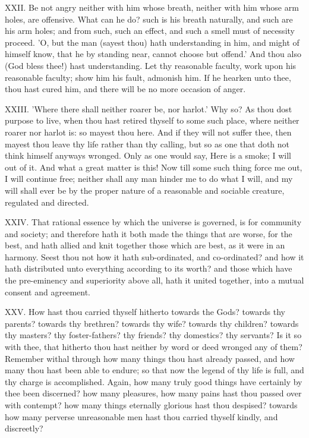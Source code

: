 XXII. Be not angry neither with him whose breath, neither with him whose
arm holes, are offensive. What can he do? such is his breath naturally,
and such are his arm holes; and from such, such an effect, and such a
smell must of necessity proceed. 'O, but the man (sayest thou) hath
understanding in him, and might of himself know, that he by standing near,
cannot choose but offend.' And thou also (God bless thee!) hast
understanding. Let thy reasonable faculty, work upon his reasonable
faculty; show him his fault, admonish him. If he hearken unto thee, thou
hast cured him, and there will be no more occasion of anger.

XXIII. 'Where there shall neither roarer be, nor harlot.' Why so? As
thou dost purpose to live, when thou hast retired thyself to some such
place, where neither roarer nor harlot is: so mayest thou here. And if
they will not suffer thee, then mayest thou leave thy life rather than thy
calling, but so as one that doth not think himself anyways wronged. Only
as one would say, Here is a smoke; I will out of it. And what a great
matter is this! Now till some such thing force me out, I will continue
free; neither shall any man hinder me to do what I will, and my will shall
ever be by the proper nature of a reasonable and sociable creature,
regulated and directed.

XXIV. That rational essence by which the universe is governed, is for
community and society; and therefore hath it both made the things that are
worse, for the best, and hath allied and knit together those which are
best, as it were in an harmony. Seest thou not how it hath sub-ordinated,
and co-ordinated? and how it hath distributed unto everything according to
its worth? and those which have the pre-eminency and superiority above
all, hath it united together, into a mutual consent and agreement.

XXV. How hast thou carried thyself hitherto towards the Gods? towards
thy parents? towards thy brethren? towards thy wife? towards thy children?
towards thy masters? thy foster-fathers? thy friends? thy domestics? thy
servants? Is it so with thee, that hitherto thou hast neither by word or
deed wronged any of them? Remember withal through how many things thou
hast already passed, and how many thou hast been able to endure; so that
now the legend of thy life is full, and thy charge is accomplished. Again,
how many truly good things have certainly by thee been discerned? how many
pleasures, how many pains hast thou passed over with contempt? how many
things eternally glorious hast thou despised? towards how many perverse
unreasonable men hast thou carried thyself kindly, and discreetly?

